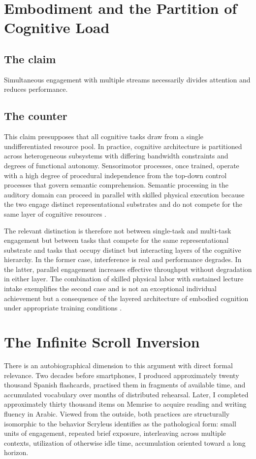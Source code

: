 \documentclass[12pt, a4paper]{article}
\begin{document}
\section{Embodiment and the Partition of Cognitive Load}

\subsection{The claim}
Simultaneous engagement with multiple streams necessarily divides attention and reduces performance.

\subsection{The counter}
This claim presupposes that all cognitive tasks draw from a single undifferentiated resource pool. In practice, cognitive architecture is partitioned across heterogeneous subsystems with differing bandwidth constraints and degrees of functional autonomy. Sensorimotor processes, once trained, operate with a high degree of procedural independence from the top-down control processes that govern semantic comprehension. Semantic processing in the auditory domain can proceed in parallel with skilled physical execution because the two engage distinct representational substrates and do not compete for the same layer of cognitive resources \cite{Clark2013,Suchman2007}.

The relevant distinction is therefore not between single-task and multi-task engagement but between tasks that compete for the same representational substrate and tasks that occupy distinct but interacting layers of the cognitive hierarchy. In the former case, interference is real and performance degrades. In the latter, parallel engagement increases effective throughput without degradation in either layer. The combination of skilled physical labor with sustained lecture intake exemplifies the second case and is not an exceptional individual achievement but a consequence of the layered architecture of embodied cognition under appropriate training conditions \cite{Hutchins1995}.

\section{The Infinite Scroll Inversion}

There is an autobiographical dimension to this argument with direct formal relevance. Two decades before smartphones, I produced approximately twenty thousand Spanish flashcards, practised them in fragments of available time, and accumulated vocabulary over months of distributed rehearsal. Later, I completed approximately thirty thousand items on Memrise to acquire reading and writing fluency in Arabic. Viewed from the outside, both practices are structurally isomorphic to the behavior Scryleus identifies as the pathological form: small units of engagement, repeated brief exposure, interleaving across multiple contexts, utilization of otherwise idle time, accumulation oriented toward a long horizon.
\end{document}
